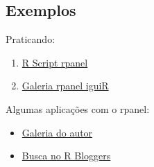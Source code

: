 

\subsection{Exemplos}

\begin{frame}
 Praticando:
  \begin{enumerate}
  \item
    \href{run:./R/rpanel/rpanel.R}{R Script rpanel}
  \item 
    \href{run:rpanel.html}{Galeria rpanel iguiR}
  \end{enumerate}

  \vspace{0.5cm}
  Algumas aplicações com o rpanel:
  \begin{itemize}
  \item \href{http://www.stats.gla.ac.uk/~adrian/rpanel/}{Galeria
      do autor}
  \item \href{http://www.r-bloggers.com/?s=rpanel}{Busca no R
      Bloggers}
  \end{itemize}

\end{frame}

